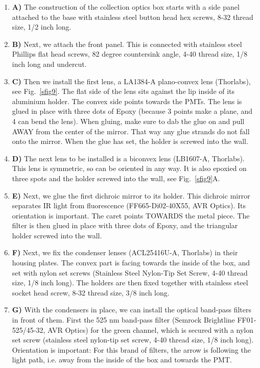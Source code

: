 \documentclass[10pt,letterpaper]{article}
\begin{document}
\begin{enumerate}[]
    \item \textbf{A)} The construction of the collection optics box starts with a side panel attached to the base with stainless steel button head hex screws, 8-32 thread size, 1/2 inch long.
    \item \textbf{B)} Next, we attach the front panel. This is connected  with stainless steel Phillips flat head screws, 82 degree countersink angle, 4-40 thread size, 1/8 inch long and undercut.
    \item \textbf{C)} Then we install the first lens, a LA1384-A plano-convex lens (Thorlabs), see Fig.~\ref{sfig9}. The flat side of the lens sits against the lip inside of its aluminium holder. The convex side points towards the PMTs. The lens is glued in place with three dots of Epoxy (because 3 points make a plane, and 4 can bend the lens). When gluing, make sure to dab the glue on and pull AWAY from the center of the mirror. That way any glue strands do not fall onto the mirror. When the glue has set, the holder is screwed into the wall. 
    \item \textbf{D)} The next lens to be installed is a biconvex lens (LB1607-A, Thorlabs). This lens is symmetric, so can be oriented in any way. It is also epoxied on three spots and the holder screwed into the wall, see Fig.~\ref{sfig9}A.
    \item \textbf{E)} Next, we glue the first dichroic mirror to its holder. This dichroic mirror separates IR light from fluorescence (FF665-Di02-40X55, AVR Optics). Its orientation is important. The caret points TOWARDS the metal piece. The filter is then glued in place with three dots of Epoxy, and the triangular holder screwed into the wall.
    \item \textbf{F)} Next, we fix the condenser lenses (ACL25416U-A, Thorlabs) in their housing plates. The convex part is facing towards the inside of the box, and set with nylon set screws (Stainless Steel Nylon-Tip Set Screw, 4-40 thread size, 1/8 inch long). The holders are then fixed together with stainless steel socket head screw, 8-32 thread size, 3/8 inch long.
    \item \textbf{G)} With the condensers in place, we can install the optical band-pass filters in front of them. First the 525 nm band-pass filter (Semrock Brightline FF01-525/45-32, AVR Optics) for the green channel, which is secured with a nylon set screw (stainless steel nylon-tip set screw, 4-40 thread size, 1/8 inch long). Orientation is important: For this brand of filters, the arrow is following the light path, i.e. away from the inside of the box and towards the PMT.

\end{enumerate}
\end{document}
